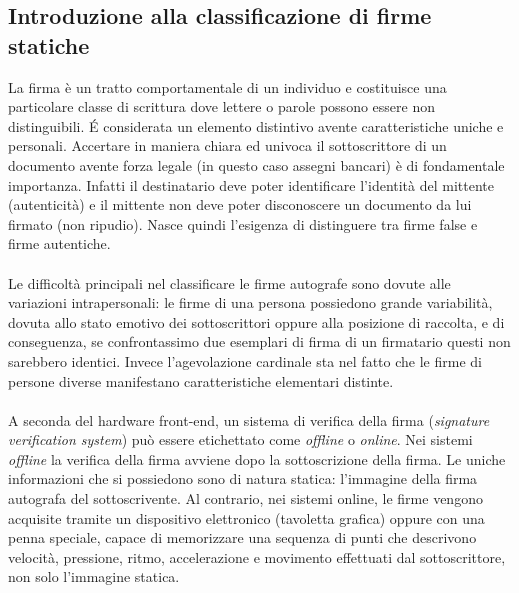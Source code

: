 \subsection{Introduzione alla classificazione di firme statiche}
\label{2.1}
La firma è un tratto comportamentale di un individuo e costituisce una particolare classe di scrittura dove lettere o parole possono essere non distinguibili. \'{E} considerata un elemento distintivo avente caratteristiche uniche e personali. Accertare in maniera chiara ed univoca il sottoscrittore di un documento avente forza legale (in questo caso assegni bancari) è di fondamentale importanza. Infatti il destinatario deve poter identificare l'identità del mittente (autenticità) e il mittente non deve poter disconoscere un documento da lui firmato (non ripudio). Nasce quindi l'esigenza di distinguere tra firme false e firme autentiche.\\\\
Le difficoltà principali nel classificare le firme autografe sono dovute alle variazioni intrapersonali: le firme di una persona possiedono grande variabilità, dovuta allo stato emotivo dei sottoscrittori oppure alla posizione di raccolta, e di conseguenza, se confrontassimo due esemplari di firma di un firmatario questi non sarebbero identici. Invece l'agevolazione cardinale sta nel fatto che le firme di persone diverse manifestano caratteristiche elementari distinte.\\\\
A seconda del hardware front-end, un sistema di verifica della firma (\emph{signature verification system}) può essere etichettato come \emph{offline} o \emph{online}. Nei sistemi \emph{offline} la verifica della firma avviene dopo la sottoscrizione della firma. Le uniche informazioni che si possiedono sono di natura statica: l'immagine della firma autografa del sottoscrivente. Al contrario, nei sistemi online, le firme vengono acquisite tramite un dispositivo elettronico (tavoletta grafica) oppure con una penna speciale, capace di memorizzare una sequenza di punti che descrivono velocità, pressione, ritmo, accelerazione e movimento effettuati dal sottoscrittore, non solo l'immagine statica.

